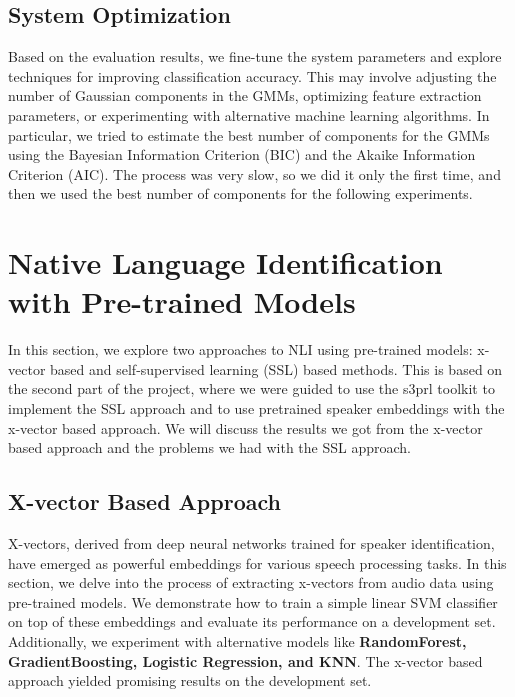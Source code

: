 \documentclass{Interspeech2024}
\begin{document}
\subsection{System Optimization}
Based on the evaluation results, we fine-tune the system parameters and explore
techniques for improving classification accuracy. This may involve adjusting
the number of Gaussian components in the GMMs, optimizing feature extraction
parameters, or experimenting with alternative machine learning algorithms. In
particular, we tried to estimate the best number of components for the GMMs
using the Bayesian Information Criterion (BIC) and the Akaike Information
Criterion (AIC). The process was very slow, so we did it only the first time,
and then we used the best number of components for the following experiments.

\section{Native Language Identification with Pre-trained Models}
In this section, we explore two approaches to NLI using
pre-trained models: x-vector based and self-supervised learning (SSL) based
methods. This is based on the second part of the project, where we were guided
to use the s3prl toolkit to implement the SSL approach and to use pretrained 
speaker embeddings with the x-vector based approach. We will discuss the results
we got from the x-vector based approach and the problems we had with the SSL
approach.

\subsection{X-vector Based Approach}

X-vectors, derived from deep neural networks trained for speaker
identification, have emerged as powerful embeddings for various speech
processing tasks. In this section, we delve into the process of extracting
x-vectors from audio data using pre-trained models. We demonstrate how to train
a simple linear SVM classifier on top of these embeddings and evaluate its
performance on a development set. Additionally, we experiment with alternative
models like \textbf{RandomForest, GradientBoosting, Logistic Regression, and KNN}. The
x-vector based approach yielded promising results on the development set.
\end{document}
